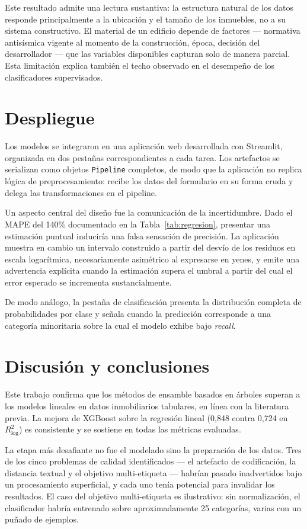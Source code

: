 \documentclass[conference]{IEEEtran}
\begin{document}
Este resultado admite una lectura sustantiva: la estructura natural de los datos responde
principalmente a la ubicación y el tamaño de los inmuebles, no a su sistema constructivo. El
material de un edificio depende de factores --- normativa antisísmica vigente al momento de la
construcción, época, decisión del desarrollador --- que las variables disponibles capturan solo
de manera parcial. Esta limitación explica también el techo observado en el desempeño de los
clasificadores supervisados.

\section{Despliegue}

Los modelos se integraron en una aplicación web desarrollada con Streamlit, organizada en dos
pestañas correspondientes a cada tarea. Los artefactos se serializan como objetos
\texttt{Pipeline} completos, de modo que la aplicación no replica lógica de preprocesamiento:
recibe los datos del formulario en su forma cruda y delega las transformaciones en el pipeline.

Un aspecto central del diseño fue la comunicación de la incertidumbre. Dado el MAPE del 140\%
documentado en la Tabla~\ref{tab:regresion}, presentar una estimación puntual induciría una
falsa sensación de precisión. La aplicación muestra en cambio un intervalo construido a partir
del desvío de los residuos en escala logarítmica, necesariamente asimétrico al expresarse en
yenes, y emite una advertencia explícita cuando la estimación supera el umbral a partir del
cual el error esperado se incrementa sustancialmente.

De modo análogo, la pestaña de clasificación presenta la distribución completa de
probabilidades por clase y señala cuando la predicción corresponde a una categoría minoritaria
sobre la cual el modelo exhibe bajo \textit{recall}.

\section{Discusión y conclusiones}

Este trabajo confirma que los métodos de ensamble basados en árboles superan a los modelos
lineales en datos inmobiliarios tabulares, en línea con la literatura previa. La mejora de
XGBoost sobre la regresión lineal (0,848 contra 0,724 en $R^2_{\log}$) es consistente y se
sostiene en todas las métricas evaluadas.

La etapa más desafiante no fue el modelado sino la preparación de los datos. Tres de los cinco
problemas de calidad identificados --- el artefacto de codificación, la distancia textual y el
objetivo multi-etiqueta --- habrían pasado inadvertidos bajo un procesamiento superficial, y
cada uno tenía potencial para invalidar los resultados. El caso del objetivo multi-etiqueta es
ilustrativo: sin normalización, el clasificador habría entrenado sobre aproximadamente 25
categorías, varias con un puñado de ejemplos.
\end{document}
